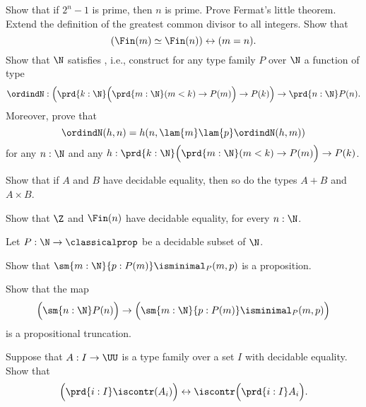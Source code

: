 \begin{exercises}
\begin{equation*}
  \end{equation*}
  \exercise Show that if $2^n-1$ is prime, then $n$ is prime.
  \exercise Prove Fermat's little theorem.
  \exercise Extend the definition of the greatest common divisor to all integers.
  \exercise Show that
  \begin{equation*}
    (\Fin(m)\simeq\Fin(n))\leftrightarrow(m=n).
  \end{equation*}
  \exercise Show that $\N$ satisfies , i.e., construct for any type family $P$ over $\N$ a function of type
  \begin{equation*}
    \ordindN : \Big(\prd{k:\N} \Big(\prd{m:\N} (m< k) \to P(m)\Big)\to P(k)\Big) \to \prd{n:\N}P(n).
  \end{equation*}
  Moreover, prove that
  \begin{equation*}
    \ordindN(h,n)=h(n,\lam{m}\lam{p}\ordindN(h,m))
  \end{equation*}
  for any $n:\N$ and any $h:\prd{k:\N}\Big(\prd{m:\N}(m<k)\to P(m)\Big)\to P(k)$.
  \exercise
  \begin{subexenum}
  \item Show that if $A$ and $B$ have decidable equality, then so do the types $A+B$ and $A\times B$.
  \item Show that $\Z$ and $\Fin(n)$ have decidable equality, for every $n:\N$.
  \end{subexenum}
  \exercise Let $P:\N\to\classicalprop$ be a decidable subset of $\N$.
  \begin{subexenum}
  \item Show that $\sm{m:\N}{p:P(m)}\isminimal_P(m,p)$ is a proposition.
  \item Show that the map
    \begin{equation*}
      \Big(\sm{n:\N}P(n)\Big)\to\Big(\sm{m:\N}{p:P(m)}\isminimal_P(m,p)\Big)
    \end{equation*}
    is a propositional truncation.
  \end{subexenum}
  \exercise Suppose that $A:I\to \UU$ is a type family over a set $I$ with decidable equality. Show that
  \begin{equation*}
    \Big(\prd{i:I}\iscontr(A_i)\Big)\leftrightarrow \iscontr\Big(\prd{i:I}A_i\Big).
  \end{equation*}
\end{exercises}
